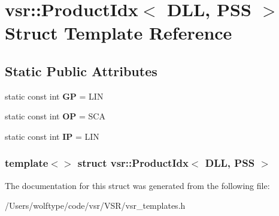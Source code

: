 \hypertarget{structvsr_1_1_product_idx_3_01_d_l_l_00_01_p_s_s_01_4}{\section{vsr\-:\-:Product\-Idx$<$ D\-L\-L, P\-S\-S $>$ Struct Template Reference}
\label{structvsr_1_1_product_idx_3_01_d_l_l_00_01_p_s_s_01_4}
}
\subsection*{Static Public Attributes}
\begin{DoxyCompactItemize}
\item 
\hypertarget{structvsr_1_1_product_idx_3_01_d_l_l_00_01_p_s_s_01_4_aaaf97ed5423f4bf1431a325c60e9616a}{static const int {\bfseries G\-P} = L\-I\-N}\label{structvsr_1_1_product_idx_3_01_d_l_l_00_01_p_s_s_01_4_aaaf97ed5423f4bf1431a325c60e9616a}

\item 
\hypertarget{structvsr_1_1_product_idx_3_01_d_l_l_00_01_p_s_s_01_4_ace5d6c45baaf16f9f197bf3e0b1ce335}{static const int {\bfseries O\-P} = S\-C\-A}\label{structvsr_1_1_product_idx_3_01_d_l_l_00_01_p_s_s_01_4_ace5d6c45baaf16f9f197bf3e0b1ce335}

\item 
\hypertarget{structvsr_1_1_product_idx_3_01_d_l_l_00_01_p_s_s_01_4_ab54fa2a2da07a10ac71b935e0bf857cc}{static const int {\bfseries I\-P} = L\-I\-N}\label{structvsr_1_1_product_idx_3_01_d_l_l_00_01_p_s_s_01_4_ab54fa2a2da07a10ac71b935e0bf857cc}

\end{DoxyCompactItemize}
\subsubsection*{template$<$$>$ struct vsr\-::\-Product\-Idx$<$ D\-L\-L, P\-S\-S $>$}



The documentation for this struct was generated from the following file\-:\begin{DoxyCompactItemize}
\item 
/\-Users/wolftype/code/vsr/\-V\-S\-R/vsr\-\_\-templates.\-h\end{DoxyCompactItemize}
